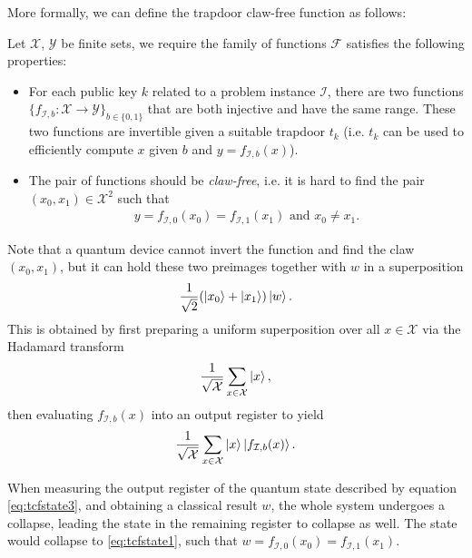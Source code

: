 \documentclass[cryptography,review,submit,pdftex,moreauthors,amsmath,amssymb,aps,strict]{Definitions/mdpi}
\begin{document}
More formally, we can define the trapdoor claw-free function as follows:
\begin{Definition}
    Let $\mathcal{X}$, $\mathcal{Y}$ be finite sets, we require the family of functions $\mathcal{F}$ satisfies the following properties:
\begin{itemize}
    \item For each public key $k$ related to a problem instance $\mathcal{I}$, there are two functions $\{f_{\mathcal{I},b}:\mathcal{X}\to\mathcal{Y}\}_{b\in\{0,1\}}$ that are both injective and have the same range. These two functions are invertible given a suitable trapdoor $t_k$ (i.e.  $t_k$ can be used to efficiently compute $x$ given $b$ and $y=f_{\mathcal{I},b}(x)$). 
    \item The pair of functions should be \textit{claw-free}, i.e. it is hard to find the pair $(x_0,x_1)\in\mathcal{X}^2$ such that 
    \begin{align}
        y=f_{\mathcal{I},0}(x_0)=f_{\mathcal{I},1}(x_1) \text{ and } x_0\neq x_1.
        \label{eq:aclaw}
    \end{align}
\end{itemize}
\end{Definition}

\noindent Note that a quantum device cannot invert the function and find the claw $(x_0,x_1)$, but it can hold these two preimages together with $w$ in a superposition
\begin{align}
    \frac{1}{\sqrt{2}}(\ket{x_0}+\ket{x_1})\ket{w}.
    \label{eq:tcfstate1}
\end{align}
This is obtained by first preparing a uniform superposition over all $x\in\mathcal{X}$ via the Hadamard transform
\begin{align}
    \frac{1}{\sqrt{\mathcal{X}}}\sum_{x\in\mathcal{X}}\ket{x},
\end{align}
then evaluating $f_{\mathcal{I},b}(x)$ into an output register to yield 
\begin{align}
    \frac{1}{\sqrt{\mathcal{X}}}\sum_{x\in\mathcal{X}}\ket{x}\ket{f_{\mathcal{I},b}(x)}.\label{eq:tcfstate3}
\end{align}

When measuring the output register of the quantum state described by equation \eqref{eq:tcfstate3}, and obtaining a classical result $w$, the whole system undergoes a collapse, leading the state in the remaining register to collapse as well. The state would collapse to \eqref{eq:tcfstate1}, such that $w=f_{\mathcal{I},0}(x_0)=f_{\mathcal{I},1}(x_1)$. 
\end{document}
